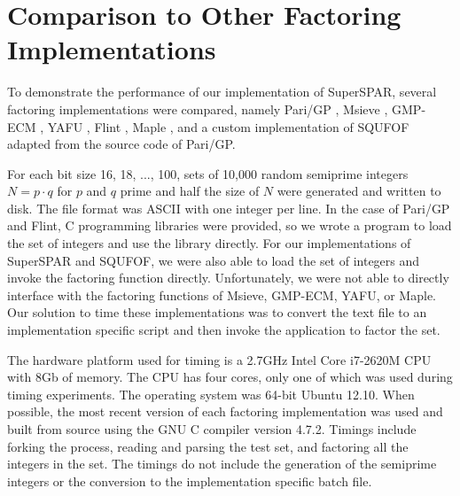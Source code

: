\documentclass{ucalgthes1}
\theoremstyle{definition}
\newcommand{\compiler}{GNU C compiler version 4.7.2}
\newcommand{\cpu}{2.7GHz Intel Core i7-2620M CPU}
\begin{document}
\clearpage

\section{Comparison to Other Factoring Implementations}
\label{sec:ssparComparison}



To demonstrate the performance of our implementation of SuperSPAR, several factoring implementations were compared, namely Pari/GP \cite{PariGP}, Msieve \cite{Msieve}, GMP-ECM \cite{Ecm}, YAFU \cite{Yafu}, Flint \cite{Flint}, Maple \cite{Maple}, and a custom implementation of SQUFOF \cite{Gower2008} adapted from the source code of Pari/GP.

For each bit size 16, 18, ..., 100, sets of 10,000 random semiprime integers $N = p \cdot q$ for $p$ and $q$ prime and half the size of $N$ were generated and written to disk.  The file format was ASCII with one integer per line.  In the case of Pari/GP and Flint, C programming libraries were provided, so we wrote a program to load the set of integers and use the library directly.  For our implementations of SuperSPAR and SQUFOF, we were also able to load the set of integers and invoke the factoring function directly.   Unfortunately, we were not able to directly interface with the factoring functions of Msieve, GMP-ECM, YAFU, or Maple.  Our solution to time these implementations was to convert the text file to an implementation specific script and then invoke the application to factor the set.

The hardware platform used for timing is a \cpu{} with 8Gb of memory.  The CPU has four cores, only one of which was used during timing experiments.  The operating system was 64-bit Ubuntu 12.10.  When possible, the most recent version of each factoring implementation was used and built from source using the \compiler{}.  Timings include forking the process, reading and parsing the test set, and factoring all the integers in the set.  The timings do not include the generation of the semiprime integers or the conversion to the implementation specific batch file.
\end{document}
